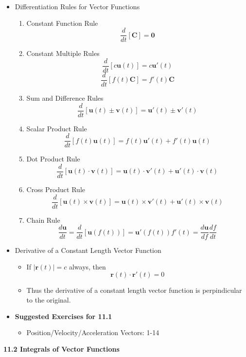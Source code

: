 \documentclass[12pt]{article}
\renewcommand{\vec}[1]{\mathbf{#1}}
\newcommand{\<}{\left<}
\renewcommand{\>}{\right>}
\begin{document}
\begin{itemize}
    \item Differentiation Rules for Vector Functions
      \begin{enumerate}
        \item Constant Function Rule
        \[\frac{d}{dt} [\vec{C}] = \vec{0}\]
        \item Constant Multiple Rules
        \[\frac{d}{dt} [c\vec{u}(t)] = c\vec{u}'(t)\]
        \[\frac{d}{dt} [f(t)\vec{C}] = f'(t)\vec{C}\]
        \item Sum and Difference Rules
        \[\frac{d}{dt} [\vec{u}(t) \pm \vec{v}(t)] = \vec{u}'(t) \pm \vec{v}'(t)\]
        \item Scalar Product Rule
        \[\frac{d}{dt} [f(t)\vec{u}(t)] = f(t)\vec{u}'(t) + f'(t)\vec{u}(t)\]
        \item Dot Product Rule
        \[\frac{d}{dt} [\vec{u}(t) \cdot \vec{v}(t)] = \vec{u}(t)\cdot\vec{v}'(t) + \vec{u}'(t)\cdot\vec{v}(t)\]
        \item Cross Product Rule
        \[\frac{d}{dt} [\vec{u}(t) \times \vec{v}(t)] = \vec{u}(t)\times\vec{v}'(t) + \vec{u}'(t)\times\vec{v}(t)\]
        \item Chain Rule
        \[\frac{d\vec{u}}{dt} = \frac{d}{dt} [\vec{u}(f(t))] =\vec{u}'(f(t))f'(t) = \frac{d\vec{u}}{df}\frac{df}{dt}\]
      \end{enumerate}
    
    \item Derivative of a Constant Length Vector Function
      \begin{itemize}
        \item If $|\vec{r}(t)|=c$ always, then \[\vec{r}(t) \cdot \vec{r}'(t) = 0\]
        \item Thus the derivative of a constant length vector function is perpindicular to the original.
      \end{itemize}
    
    \item \textbf{Suggested Exercises for 11.1}
      \begin{itemize}
        \item Position/Velocity/Acceleration Vectors: 1-14
      \end{itemize}
  \end{itemize}
  
  \newpage
  
  \centerline{\bf 11.2 Integrals of Vector Functions}
  
\end{document}
